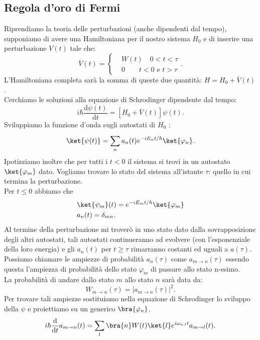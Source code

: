\subsection{Regola d'oro di Fermi}%
\label{sub:Regola d'oro di Fermi}

Riprendiamo la teoria delle perturbazioni (anche dipendenti dal tempo), supponiamo di avere una Hamiltoniana per il nostro sistema $H_0$ e di inserire una perturbazione $V(t) $ tale che:
\[
    \overline{V}(t) = \begin{cases}
	&W(t)  \quad  0<t<\tau\\
	&0 	\quad \quad t<0 \text{ e } t>\tau
    \end{cases}
.\] 
L'Hamiltoniana completa sarà la somma di queste due quantità: $H=H_0+\overline{V}(t)$.\\
Cerchiamo le soluzioni alla equazione di Schrodinger dipendente dal tempo:
\[
    i\hbar \frac{\text{d} \psi(t)}{\text{d} t} 
    = \left[H_0+\overline{V}(t) \right]\psi (t) 
.\] 
Sviluppiamo la funzione d'onda sugli autostati di $H_0$ :
\[
    \ket{\psi(t)}=\sum_{n}^{} a_n(t) e^{-i E_n t /\hbar }\ket{\varphi_n}
.\] 
Ipotizziamo inoltre che per tutti i $t<0$ il sistema si trovi in un autostato $\ket{\varphi_m}$ dato. Vogliamo trovare lo stato del sistema all'istante $ \tau$: quello in cui termina la perturbazione.\\
Per $t\le 0$ abbiamo che 
\[\begin{aligned}
    &\ket{\psi_m}(t) = e^{-iE_m t /\hbar } \ket{\varphi_m}\\
    &a_n(t) = \delta_{mn}
.\end{aligned}\]
Al termine della perturbazione mi troverò in uno stato dato dalla sovrapposizione degli altri autostati, tali autostati continueranno ad evolvere (con l'esponenziale della loro energia) e gli $a_n(t)$ per $t\ge \tau$ rimarranno costanti ed uguali a $a(\tau)$.\\
Possiamo chiamare le ampiezze di probabilità $a_n(\tau)$ come $a_{m\to n}(\tau) $ essendo questa l'ampiezza di probabilità dello stato $\varphi_m$ di passare allo stato n-esimo.\\
La probabilità di andare dallo stato $m$ allo stato $n$ sarà data da:
\[
    W_{m\to n}(\tau)=\left|a_{m\to n}(\tau) \right|^2
.\] 
Per trovare tali ampiezze sostituiamo nella equazione di Schrodinger lo sviluppo della $\psi$ e proiettiamo su un generico $\bra{\varphi_n}$.\\
\[
    i\hbar \frac{\text{d} }{\text{d} t} a_{m\to n}(t) 
    = \sum_{l}^{} \bra{n}W(t)\ket{l}e^{i\omega_{n,l} t}a_{m\to l}(t) 
.\] 
